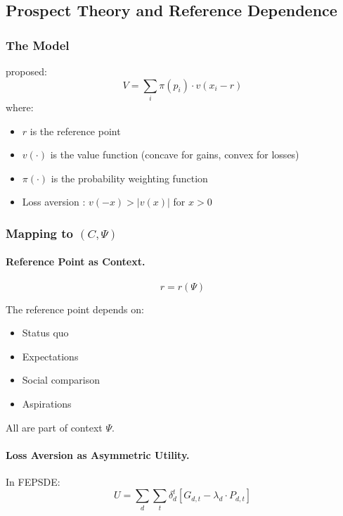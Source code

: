 \documentclass[12pt,a4paper]{article}
\begin{document}
\subsection{Prospect Theory and Reference Dependence}
\label{app:prospecttheory}

\subsubsection{The Model}

\citet{kahnemantversky1979} proposed:
\begin{equation}
  V = \sum_i \pi(p_i) \cdot v(x_i - r)
\end{equation}
where:
\begin{itemize}
  \item $r$ is the reference point
  \item $v(\cdot)$ is the value function (concave for gains, convex for losses)
  \item $\pi(\cdot)$ is the probability weighting function
  \item Loss aversion \citep{tverskykahneman1991}: $v(-x) > |v(x)|$ for $x > 0$
\end{itemize}

\subsubsection{Mapping to $(C, \Psi)$}

\paragraph{Reference Point as Context.}
\begin{equation}
  r = r(\Psi)
\end{equation}

The reference point depends on:
\begin{itemize}
  \item Status quo
  \item Expectations
  \item Social comparison
  \item Aspirations
\end{itemize}

All are part of context $\Psi$.

\paragraph{Loss Aversion as Asymmetric Utility.}
In FEPSDE:
\begin{equation}
  U = \sum_d \sum_t \delta_d^t [G_{d,t} - \lambda_d \cdot P_{d,t}]
\end{equation}
\end{document}
